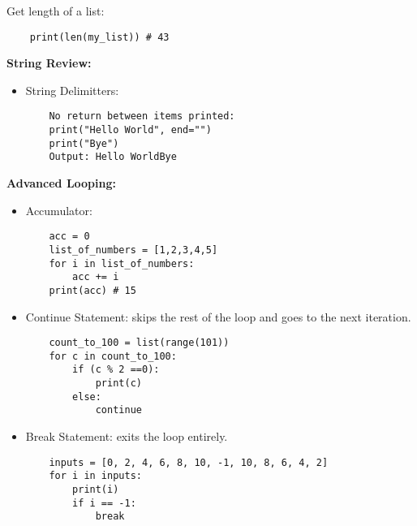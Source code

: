\documentclass[11pt]{article}
\begin{document}
Get length of a list:
\begin{verbatim}
    print(len(my_list)) # 43
\end{verbatim}
\textbf{String Review:}
\begin{itemize}
    \item String Delimitters: 
    \begin{verbatim}
    No return between items printed:
    print("Hello World", end="") 
    print("Bye")
    Output: Hello WorldBye
    \end{verbatim}
\end{itemize}
\textbf{Advanced Looping:} 
\begin{itemize}
    \item Accumulator:
\begin{verbatim}
    acc = 0
    list_of_numbers = [1,2,3,4,5]
    for i in list_of_numbers:
        acc += i
    print(acc) # 15
\end{verbatim}
    \item Continue Statement: skips the rest of the loop and goes to the next iteration.
\begin{verbatim}
    count_to_100 = list(range(101))
    for c in count_to_100:
        if (c % 2 ==0):
            print(c)
        else:
            continue
\end{verbatim}
    \item Break Statement: exits the loop entirely.
\begin{verbatim}
    inputs = [0, 2, 4, 6, 8, 10, -1, 10, 8, 6, 4, 2]
    for i in inputs:
        print(i)
        if i == -1:
            break
\end{verbatim}

\end{itemize}
\end{document}
